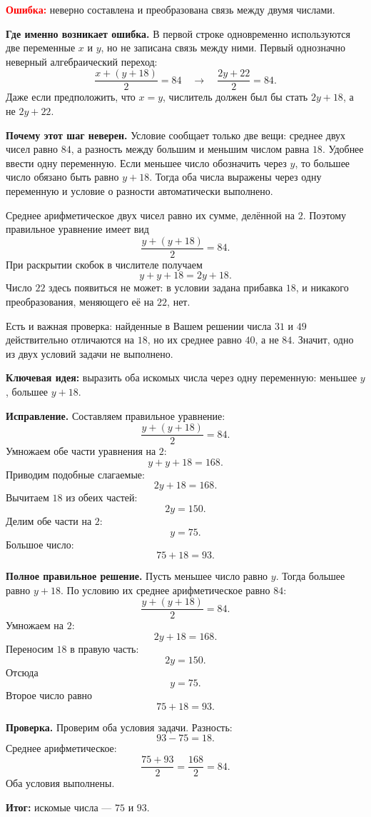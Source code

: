 \documentclass[12pt,a4paper]{article}
\begin{document}
\textcolor{red}{\textbf{Ошибка:}} неверно составлена и преобразована связь между двумя числами.

\textbf{Где именно возникает ошибка.}
В первой строке одновременно используются две переменные $x$ и $y$, но не записана связь между ними. Первый однозначно неверный алгебраический переход:
\[
\frac{x+(y+18)}{2}=84
\quad\longrightarrow\quad
\frac{2y+22}{2}=84.
\]
Даже если предположить, что $x=y$, числитель должен был бы стать $2y+18$, а не $2y+22$.

\textbf{Почему этот шаг неверен.}
Условие сообщает только две вещи: среднее двух чисел равно $84$, а разность между большим и меньшим числом равна $18$. Удобнее ввести одну переменную. Если меньшее число обозначить через $y$, то большее число обязано быть равно $y+18$. Тогда оба числа выражены через одну переменную и условие о разности автоматически выполнено.

Среднее арифметическое двух чисел равно их сумме, делённой на $2$. Поэтому правильное уравнение имеет вид
\[
\frac{y+(y+18)}{2}=84.
\]
При раскрытии скобок в числителе получаем
\[
y+y+18=2y+18.
\]
Число $22$ здесь появиться не может: в условии задана прибавка $18$, и никакого преобразования, меняющего её на $22$, нет.

Есть и важная проверка: найденные в Вашем решении числа $31$ и $49$ действительно отличаются на $18$, но их среднее равно $40$, а не $84$. Значит, одно из двух условий задачи не выполнено.

\textcolor{blue!60!black}{\textbf{Ключевая идея:}} выразить оба искомых числа через одну переменную: меньшее $y$, большее $y+18$.

\textbf{Исправление.}
Составляем правильное уравнение:
\[
\frac{y+(y+18)}{2}=84.
\]
Умножаем обе части уравнения на $2$:
\[
y+y+18=168.
\]
Приводим подобные слагаемые:
\[
2y+18=168.
\]
Вычитаем $18$ из обеих частей:
\[
2y=150.
\]
Делим обе части на $2$:
\[
y=75.
\]
Большое число:
\[
75+18=93.
\]

\textbf{Полное правильное решение.}
Пусть меньшее число равно $y$. Тогда большее равно $y+18$. По условию их среднее арифметическое равно $84$:
\[
\frac{y+(y+18)}{2}=84.
\]
Умножаем на $2$:
\[
2y+18=168.
\]
Переносим $18$ в правую часть:
\[
2y=150.
\]
Отсюда
\[
y=75.
\]
Второе число равно
\[
75+18=93.
\]

\textbf{Проверка.}
Проверим оба условия задачи. Разность:
\[
93-75=18.
\]
Среднее арифметическое:
\[
\frac{75+93}{2}=\frac{168}{2}=84.
\]
Оба условия выполнены.

\textcolor{teal!60!black}{\textbf{Итог:}} искомые числа --- $75$ и $93$.
\end{document}
